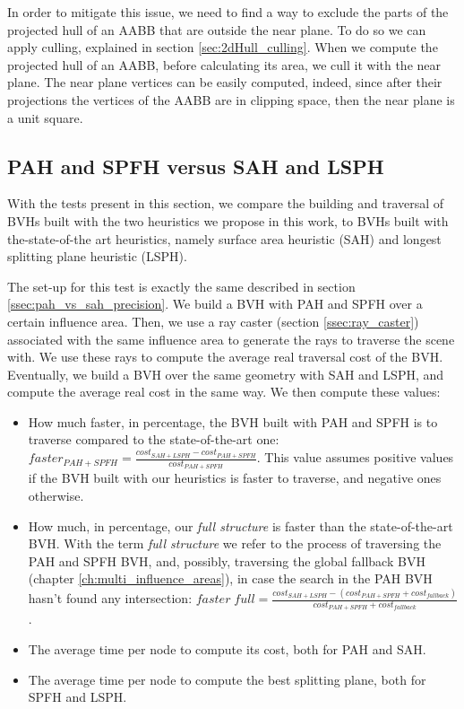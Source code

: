 \documentclass{PoliMi_MasterThesis}
\begin{document}
In order to mitigate this issue, we need to find a way to exclude the parts of the projected hull of an AABB that are outside the near plane. To do so we can apply culling, explained in section \ref{sec:2dHull_culling}. When we compute the projected hull of an AABB, before calculating its area, we cull it with the near plane. The near plane vertices can be easily computed, indeed, since after their projections the vertices of the AABB are in clipping space, then the near plane is a unit square.

\subsection{PAH and SPFH versus SAH and LSPH} \label{ssec:pah_spfh_vs_sah_lsph}
With the tests present in this section, we compare the building and traversal of BVHs built with the two heuristics we propose in this work, to BVHs built with the-state-of-the art heuristics, namely surface area heuristic (SAH) and longest splitting plane heuristic (LSPH). 

The set-up for this test is exactly the same described in section \ref{ssec:pah_vs_sah_precision}. We build a BVH with PAH and SPFH over a certain influence area. Then, we use a ray caster (section \ref{ssec:ray_caster}) associated with the same influence area to generate the rays to traverse the scene with. We use these rays to compute the average real traversal cost of the BVH. Eventually, we build a BVH over the same geometry with SAH and LSPH, and compute the average real cost in the same way. We then compute these values: 

\begin{itemize}
	\item How much faster, in percentage, the BVH built with PAH and SPFH is to traverse compared to the state-of-the-art one: $faster_{PAH+SPFH} = \frac{cost_{SAH+LSPH}-cost_{PAH+SPFH}}{cost_{PAH+SPFH}}$. This value assumes positive values if the BVH built with our heuristics is faster to traverse, and negative ones otherwise.
	\item How much, in percentage, our \textit{full structure} is faster than the state-of-the-art BVH. With the term \textit{full structure} we refer to the process of traversing the PAH and SPFH BVH, and, possibly, traversing the global fallback BVH (chapter \ref{ch:multi_influence_areas}), in case the search in the PAH BVH hasn't found any intersection: $faster \; full = \frac{cost_{SAH+LSPH}-(cost_{PAH+SPFH}+cost_{fallback})}{cost_{PAH+SPFH}+cost_{fallback}}$.
	\item The average time per node to compute its cost, both for PAH and SAH.
	\item The average time per node to compute the best splitting plane, both for SPFH and LSPH.
\end{itemize}
\end{document}
